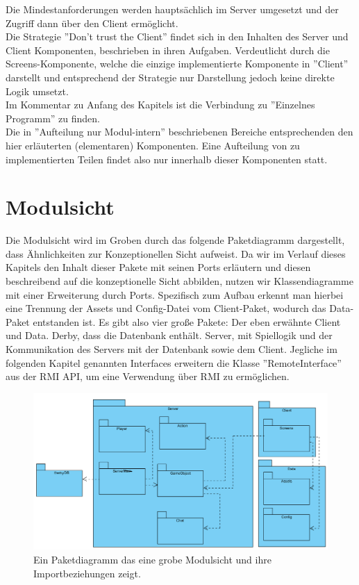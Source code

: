 \documentclass[fontsize=12pt,paper=a4,twoside]{scrartcl}
\begin{document}
 Die Mindestanforderungen werden hauptsächlich im Server umgesetzt und der Zugriff dann über den Client ermöglicht. \\

Die Strategie ''Don't trust the Client'' findet sich in den Inhalten des Server und Client Komponenten, beschrieben in ihren Aufgaben. Verdeutlicht durch die Screens-Komponente, welche die einzige implementierte Komponente in ''Client'' darstellt und entsprechend der Strategie nur Darstellung jedoch keine direkte Logik umsetzt. \\

Im Kommentar zu Anfang des Kapitels ist die Verbindung zu ''Einzelnes Programm'' zu finden. \\ 

Die in ''Aufteilung nur Modul-intern'' beschriebenen Bereiche entsprechenden den hier erläuterten (elementaren) Komponenten. Eine Aufteilung von zu implementierten Teilen findet also nur innerhalb dieser Komponenten statt.\\


\section{Modulsicht}
\label{sec:modulsicht}
Die Modulsicht wird im Groben durch das folgende Paketdiagramm dargestellt, dass Ähnlichkeiten zur Konzeptionellen Sicht aufweist. Da wir im Verlauf dieses Kapitels den Inhalt dieser Pakete mit seinen Ports erläutern und diesen beschreibend auf die konzeptionelle Sicht abbilden, nutzen wir Klassendiagramme mit einer Erweiterung durch Ports. Spezifisch zum Aufbau erkennt man hierbei eine Trennung der Assets und Config-Datei vom Client-Paket, wodurch das Data-Paket entstanden ist. Es gibt also vier große Pakete: Der eben erwähnte Client und Data. Derby, dass die Datenbank enthält. Server, mit Spiellogik und der Kommunikation des Servers mit der Datenbank sowie dem Client. Jegliche im folgenden Kapitel genannten Interfaces erweitern die Klasse ''RemoteInterface'' aus der RMI API, um eine Verwendung über RMI zu ermöglichen.

\begin{figure}[h]
\centering
\includegraphics[width=1.0\linewidth]{Paketdiagramm}
\caption{Ein Paketdiagramm das eine grobe Modulsicht und ihre Importbeziehungen zeigt.}
\label{fig:Paketdiagramm}
\end{figure}
\end{document}
